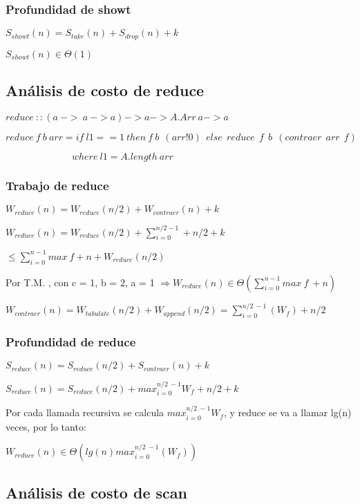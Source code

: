 \documentclass[a4paper,12pt]{article}
\begin{document}
\subsubsection{Profundidad de showt}

$S_{showt}(n) = S_{take}(n) + S_{drop}(n) + k$

$S_{showt}(n) \in \Theta(1)$

\subsection{Análisis de costo de reduce}

$reduce\: :: (a\: ->\: a\: -> a) -> a -> A.Arr\: a -> a$

$reduce\: f\: b\: arr = if\: l1 == 1\: then\: f \:b \:\:(arr ! 0) \:\:else\:\: reduce\:\: f \:\:b \:\:(contraer\:\: arr\:\: f)$
		           
$\:\:\:\:\:\:\:\:\:\:\:\:\:\:\:\:\:\:\:\:\:\:\:\:\:\:\:\:\:\:\:where \:l1 = A.length\: arr	$

\subsubsection{Trabajo de reduce}

$W_{reduce}(n) = W_{reduce}(n/2) + W_{contraer}(n) + k$

$W_{reduce}(n) = W_{reduce}(n/2) + \sum_{i=0}^{n/2 -1} + n/2 + k$

$\le \sum_{i=0}^{n-1} max\: f + n + W_{reduce}(n/2)$

Por T.M. , con c = 1, b = 2, a = 1 $\Rightarrow W_{reduce}(n) \in \Theta(\sum_{i=0}^{n-1} max \:f \:+ n)$

$W_{contraer}(n) = W_{tabulate}(n/2) + W_{append}(n/2) = \sum_{i=0}^{n/2 \:- 1} (W_{f}) + n/2$

\subsubsection{Profundidad de reduce}

$S_{reduce}(n) = S_{reduce}(n/2) + S_{contraer}(n) + k$

$S_{reduce}(n) = S_{reduce}(n/2) + max_{i=0}^{n/2\:-1} W_{f} + n/2 + k$

Por cada llamada recursiva se calcula $max_{i=0}^{n/2\:-1} W_{f}$, y reduce se va a llamar lg(n) veces, por
lo tanto:

$W_{reduce}(n) \in \Theta(lg(n) max_{i=0}^{n/2\:-1}(W_{f})) $

\subsection{Análisis de costo de scan}
\end{document}
